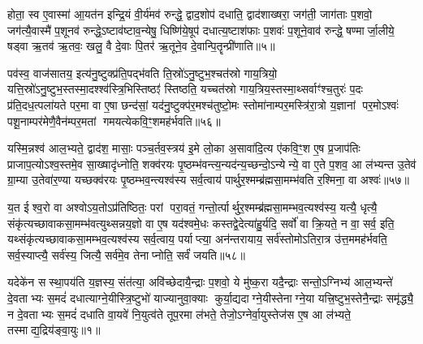 होता॒ स्व ए॒वास्मा॑ आ॒यत॑न इन्द्रि॒यं वी॒र्य॑मव॑ रुन्द्धे॒ द्वाद॒शोप॑ दधाति॒ द्वाद॑शाख्षरा॒ जग॑ती॒ जाग॑ताः प॒शवो॒ जग॑त्यै॒वास्मै॑ प॒शूनव॑ रुन्द्धे॒ऽष्टाव॑ष्टाव॒न्येषु॒ धिष्णि॑ये॒षूप॑ दधात्य॒ष्टाश॑फाः प॒शवः॑ प॒शूने॒वाव॑ रुन्द्धे॒ षण्मार्जा॒लीये॒ षड्वा ऋ॒तव॑ ऋ॒तवः॒ खलु॒ वै दे॒वाः पि॒तर॑ ऋ॒तूने॒व दे॒वान्पि॒तॄन्प्री॑णाति॥५॥

{\anuvakamend[{प्र भ॑वति यजमानायत॒नं वा अ॒ष्टाच॑त्वारिशच्च॥11॥}]}

पव॑स्व॒ वाज॑सातय॒ इत्य॑नु॒ष्टुक्प्र॑ति॒पद्भ॑वति ति॒स्रो॑ऽनु॒ष्टुभ॒श्चत॑स्रो गाय॒त्रियो॒ यत्ति॒स्रो॑ऽनु॒ष्टुभ॒स्तस्मा॒दश्श्व॑स्त्रि॒भिस्तिष्ठꣵ॑ स्तिष्ठति॒ यच्चत॑स्रो गाय॒त्रिय॒स्तस्मा॒थ्सर्वाꣳ॑श्च॒तुरः॑ प॒दः प्र॑ति॒दध॒त्पला॑यते पर॒मा वा ए॒षा छन्द॑सां॒ यद॑नु॒ष्टुक्प॑र॒मश्च॑तुष्टो॒मः स्तोमा॑नाम्पर॒मस्त्रि॑रा॒त्रो य॒ज्ञानां पर॒मोऽश्वः॑ पशू॒नाम्पर॑मेणै॒वैन॑म्पर॒मतां गमयत्येकवि॒ꣳ॒शमह॑र्भवति॥५६॥

यस्मि॒न्नश्व॑ आल॒भ्यते॒ द्वाद॑श॒ मासाः॒ पञ्च॒र्तव॒स्त्रय॑ इ॒मे लो॒का अ॒सावा॑दि॒त्य ए॑कवि॒ꣳ॒श ए॒ष प्र॒जाप॑तिः प्राजाप॒त्योऽश्व॒स्तमे॒व सा॒ख्षादृ॑ध्नोति॒ शक्व॑रयः पृ॒ष्ठम्भ॑वन्त्य॒न्यद॑न्य॒च्छन्दो॒ऽन्येन्ये॒ वा ए॒ते प॒शव॒ आ ल॑भ्यन्त उ॒तेव॑ ग्रा॒म्या उ॒तेवा॑र॒ण्या यच्छक्व॑रयः पृ॒ष्ठम्भव॒न्त्यश्व॑स्य सर्व॒त्वाय॑ पार्थुर॒श्मम्ब्र॑ह्मसा॒मम्भ॑वति र॒श्मिना॒ वा अश्वः॑॥५७॥

य॒त ईश्व॒रो वा अश्वोऽय॒तोऽप्र॑तिष्ठितः॒ परां परा॒वतं॒ गन्तो॒र्त्पार्थुर॒श्मम्ब्र॑ह्मसा॒मम्भव॒त्यश्व॑स्य॒ यत्यै॒ धृत्यै॒ संकृ॑त्यच्छावाकसा॒मम्भ॑वत्युथ्सन्नय॒ज्ञो वा ए॒ष यद॑श्वमे॒धः कस्तद्वे॒देत्या॑हु॒र्यदि॒ सर्वो॑ वा क्रि॒यते॒ न वा॒ सर्व॒ इति॒ यथ्संकृ॑त्यच्छावाकसा॒मम्भव॒त्यश्व॑स्य सर्व॒त्वाय॒ पर्याप्त्या॒ अन॑न्तरायाय॒ सर्व॑स्तोमोऽतिरा॒त्र उ॑त्त॒ममह॑र्भवति॒ सर्व॒स्याप्त्यै॒ सर्व॑स्य॒ जित्यै॒ सर्व॑मे॒व तेनाप्नोति॒ सर्वं॑ जयति॥५८॥

{}


{}

\setcounter{anuvakam}{0}
यदेके॑न सस्था॒पय॑ति य॒ज्ञस्य॒ संत॑त्या॒ अवि॑च्छेदायै॒न्द्राः प॒शवो॒ ये मु॑ष्क॒रा यदै॒न्द्राः सन्तो॒ऽग्निभ्य॑ आल॒भ्यन्ते॑ दे॒वताभ्यः स॒मदं॑ दधात्याग्ने॒यीस्त्रि॒ष्टुभो॑ याज्यानुवा॒क्याः कुर्या॒द्यदाग्ने॒यीस्तेनाग्ने॒या यत्त्रि॒ष्टुभ॒स्तेनै॒न्द्राः समृ॑द्ध्यै॒ न दे॒वताभ्यः स॒मदं॑ दधाति वा॒यवे॑ नि॒युत्व॑ते तूप॒रमा ल॑भते॒ तेजो॒ऽग्नेर्वा॒युस्तेज॑स ए॒ष आ ल॑भ्यते॒ तस्माद्य॒द्रिय॑ङ्वा॒युः॥१॥

